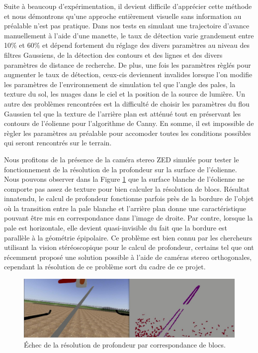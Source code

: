 Suite à beaucoup d'expérimentation, il devient difficile d'apprécier cette méthode et nous démontrons qu'une approche entièrement visuelle sans information au préalable n'est pas pratique. Dans nos tests en simulant une trajectoire d'avance manuellement à l'aide d'une manette, le taux de détection varie grandement entre 10\% et 60\% et dépend fortement du réglage des divers paramètres au niveau des filtres Gaussiens, de la détection des contours et des lignes et des divers paramètres de distance de recherche. De plus, une fois les paramètres règlés pour augmenter le taux de détection, ceux-cis deviennent invalides lorsque l'on modifie les paramètres de l'environnement de simulation tel que l'angle des pales, la texture du sol, les nuages dans le ciel et la position de la source de lumière. Un autre des problèmes rencontrées est la difficulté de choisir les paramètres du flou Gaussien tel que la texture de l'arrière plan est atténué tout en préservant les contours de l'éolienne pour l'algorithme de Canny. En somme, il est impossible de règler les paramètres au préalable pour accomoder toutes les conditions possibles qui seront rencontrés sur le terrain.

Nous profitons de la présence de la caméra stereo ZED simulée pour tester le fonctionnement de la résolution de la profondeur sur la surface de l'éolienne. Nous pouvons observer dans la Figure \ref{fig:stereo_fail} que la surface blanche de l'éolienne ne comporte pas assez de texture pour bien calculer la résolution de blocs. Résultat innatendu, le calcul de profondeur fonctionne parfois près de la bordure de l'objet où la transition entre la pale blanche et l'arrière plan donne une caractéristique pouvant être mis en correspondance dans l'image de droite. Par contre, lorsque la pale est horizontale, elle devient quasi-invisible du fait que la bordure est parallèle à la géométrie épipolaire. Ce problème est bien connu par les chercheurs utilisant la vision stéréoscopique pour le calcul de profondeur, certains tel que \citep{meier2017real} ont récemment proposé une solution possible à l'aide de caméras stereo orthogonales, cependant la résolution de ce problème sort du cadre de ce projet.

\begin{figure}[htb]
  \includegraphics[width=\linewidth]{images/stereo_failure.jpg}
  \caption{Échec de la résolution de profondeur par correspondance de blocs.}
  \label{fig:stereo_fail}
\end{figure}

